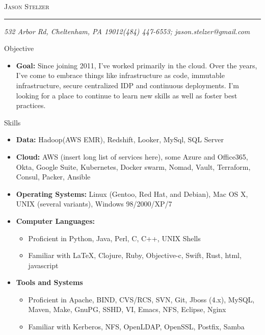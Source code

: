 \documentclass[11pt,oneside]{article}
\makeatletter
\newcommand{\name}{Jason Stelzer}
\newcommand{\addr}{532 Arbor Rd, Cheltenham, PA 19012}
\newcommand{\phone}{(484) 447-6553}
\newcommand{\email}{jason.stelzer@gmail.com}
\newcommand{\bigname}[1]{
        \begin{center}\fontfamily{phv}\selectfont\Huge\scshape#1\end{center}
}
\newenvironment{ressection}[1]{
        \vspace{4pt}
        {\fontfamily{phv}\selectfont\Large#1}
        \begin{itemize}
        \vspace{3pt}
}{
        \end{itemize}
}
\newcommand{\resitem}[1]{
        \vspace{-4pt}
        \item \begin{flushleft} #1 \end{flushleft}
}
\newcommand{\ressubitem}[1]{
        \vspace{-1pt}
        \item \begin{flushleft} #1 \end{flushleft}
}
\newenvironment{reslist}[1]{
        \resitem{\textbf{#1}}
        \vspace{-5pt}
        \begin{itemize}
}{
        \end{itemize}
}
\makeatother
\begin{document}
 \selectfont

\bigname{\name}

\vspace{-8pt} \rule{\textwidth}{1pt}

\vspace{-1pt} {\small\itshape \addr \hfill \phone; \email}

\vspace{8 pt}

\begin{ressection}{Objective}

  \resitem{\textbf{Goal:} Since joining 2011, I've worked primarily in the cloud. Over the years, I've come to embrace things like infrastructure as code, immutable infrastructure, secure centralized IDP and continuous deployments. I'm looking for a place to continue to learn new skills as well as foster best practices.}
  
\end{ressection}


\begin{ressection}{Skills}

  \resitem{\textbf{Data:} Hadoop(AWS EMR), Redshift, Looker, MySql, SQL Server}

  \resitem{\textbf{Cloud:} AWS (insert long list of services here), some Azure and Office365, Okta, Google Suite, Kubernetes, Docker swarm, Nomad, Vault, Terraform, Consul, Packer, Ansible }

  \resitem{\textbf{Operating Systems:} Linux (Gentoo, Red Hat, and
    Debian), Mac OS X, UNIX (several variants), Windows 98/2000/XP/7}

  \begin{reslist}{Computer Languages:}

    \ressubitem{Proficient in Python, Java, Perl, C, C++,  UNIX Shells}

    \ressubitem{Familiar with \LaTeX, Clojure, Ruby, Objective-c, Swift, Rust, html, javascript}

  \end{reslist}

  \begin{reslist}{Tools and Systems}

    \ressubitem{Proficient in Apache, BIND, CVS/RCS, SVN, Git, Jboss
      (4.x), MySQL, Maven, Make, GnuPG, SSHD, VI, Emacs, NFS, Eclipse, Nginx}

    \ressubitem{Familiar with Kerberos, NFS, OpenLDAP, OpenSSL, Postfix, Samba}

  \end{reslist}


\end{ressection}
\end{document}
